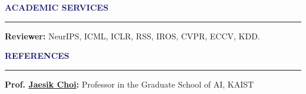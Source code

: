 \documentclass{resume} %
\renewenvironment{rSection}[1]{
\sectionskip
\textcolor{MidnightBlue}{\MakeUppercase{#1}}
\sectionlineskip
\hrule
\begin{list}{}{
\setlength{\leftmargin}{1.5em}
}
\item[]
}{
\end{list}
}
\begin{document}
\begin{rSection}{\bf Academic Services}
    \textbf{Reviewer:} NeurIPS, ICML, ICLR, RSS, IROS, CVPR, ECCV, KDD.
\end{rSection}

\begin{rSection}{\bf References}
{\textbf{Prof. \href{http://sailab.kaist.ac.kr/members/jaesik/}{Jaesik Choi}:} Professor in the Graduate School of AI, KAIST}
\end{rSection}



\end{document}

